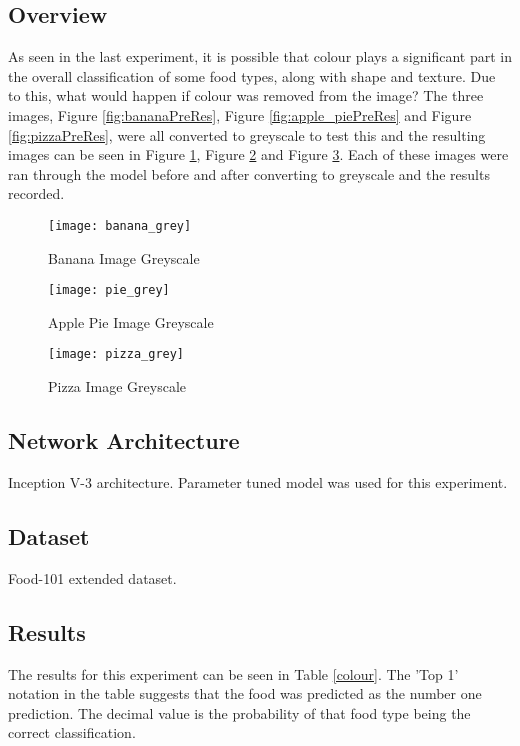 \subsection*{Overview}
As seen in the last experiment, it is possible that colour plays a significant part in the overall classification of some food types, along with shape and texture. Due to this, what would happen if colour was removed from the image? The three images, Figure \ref{fig:bananaPreRes}, Figure \ref{fig:apple_piePreRes} and Figure \ref{fig:pizzaPreRes}, were all converted to greyscale to test this and the resulting images can be seen in Figure \ref{fig:bananaGrey}, Figure \ref{fig:applePieGrey} and Figure \ref{fig:pizzaGrey}. Each of these images were ran through the model before and after converting to greyscale and the results recorded.

\begin{figure}
    \texttt{[image: banana\_grey]}
    \caption{Banana Image Greyscale}
    \label{fig:bananaGrey}
\end{figure}

\begin{figure}
    \texttt{[image: pie\_grey]}
    \caption{Apple Pie Image Greyscale}
    \label{fig:applePieGrey}
\end{figure}

\begin{figure}
    \texttt{[image: pizza\_grey]}
    \caption{Pizza Image Greyscale}
    \label{fig:pizzaGrey}
\end{figure}

\subsection*{Network Architecture}
Inception V-3 architecture. Parameter tuned model was used for this experiment.

\subsection*{Dataset}
Food-101 extended dataset.

\subsection*{Results}
The results for this experiment can be seen in Table \ref{colour}.
The 'Top 1' notation in the table suggests that the food was predicted as the number one prediction. The decimal value is the probability of that food type being the correct classification.

